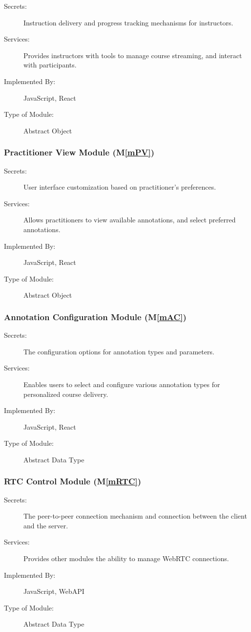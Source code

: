 \documentclass[12pt, titlepage]{article}
\newcommand{\mref}[1]{M\ref{#1}}
\begin{document}
\begin{description}
\item[Secrets:] Instruction delivery and progress tracking mechanisms for instructors.
\item[Services:] Provides instructors with tools to manage course streaming, and interact with participants.
\item[Implemented By:] JavaScript, React
\item[Type of Module:] Abstract Object
\end{description}

\subsubsection{Practitioner View Module (\mref{mPV})}

\begin{description}
\item[Secrets:] User interface customization based on practitioner's preferences.
\item[Services:] Allows practitioners to view available annotations, and select preferred annotations.
\item[Implemented By:] JavaScript, React
\item[Type of Module:] Abstract Object
\end{description}

\subsubsection{Annotation Configuration Module (\mref{mAC})}

\begin{description}
\item[Secrets:] The configuration options for annotation types and parameters.
\item[Services:] Enables users to select and configure various annotation types for personalized course delivery.
\item[Implemented By:] JavaScript, React
\item[Type of Module:] Abstract Data Type
\end{description}

\subsubsection{RTC Control Module (\mref{mRTC})}

\begin{description}
\item[Secrets:] The peer-to-peer connection mechanism and connection between the client and the server.
\item[Services:] Provides other modules the ability to manage WebRTC connections.
\item[Implemented By:] JavaScript, WebAPI
\item[Type of Module:] Abstract Data Type
\end{description}
\end{document}
